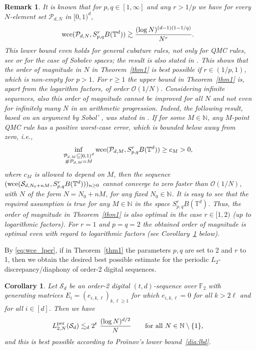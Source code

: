 \documentclass[12pt, a4paper]{article}
\newtheorem{cor}[thm]{Corollary}
\newtheorem{rem}[thm]{Remark}
\def\P{\mathcal{P}}
\def\S{\mathcal{S}}
\newcommand{\wce}{{\rm wce}}
\newcommand{\N}{{\mathbb{N}}} %
\newcommand{\calP}{{\mathcal{P}}}
\newcommand{\bbT}{{\mathbb{T}}}
\newcommand{\bbN}{{\mathbb{N}}}
\begin{document}
\begin{rem}\rm 
It is known that for $p,q \in [1,\infty]$ and any $r>1/p$ we have for every $N$-element set $\calP_{d,N}$ in $[0,1)^d$, 
$$
\wce(\P_{d,N}, S^r_{p, q}B(\bbT^d)) \gtrsim \frac{(\log N)^{(d-1)(1-1/q)}}{N^r}.
$$ This lower bound even holds for general cubature rules, not only for QMC rules, see \cite[Theorem~4.1]{DU15} or \cite{T90} for the case of Sobolev spaces; the result is also stated in \cite[Theorem~5.5]{HMOU}. This shows that the order of magnitude in $N$ in Theorem~\ref{thm1} is best possible if $r \in (1/p,1)$, which is non-empty for $p>1$. For $r\ge 1$ the upper bound in Theorem~\ref{thm1} is, apart from the logarithm factors, of order $\mathcal{O}(1/N)$. Considering infinite sequences, also this order of magnitude cannot be improved for all $N$ and not even for infinitely many $N$ in an arithmetic progression. Indeed, the following result, based on an argument by Sobol' \cite{S98}, was stated in \cite[Proposition~1]{HKKN12}. If for some $M \in \bbN$, any $M$-point QMC rule has a positive worst-case error, which is bounded below away from zero, i.e.,
\begin{equation*}%
\inf_{\substack{\P_{d,M} \subseteq [0,1)^d\\ \#\P_{d,M}=M}}  \wce(\P_{d,M}, S^r_{p, q}B(\bbT^d)) \ge c_M > 0,
\end{equation*}
where $c_M$ is allowed to depend on $M$, then the sequence 
$(\wce(\S_{d,N_0+n M}, S^r_{p, q}B(\bbT^d)))_{n\ge 0}$
cannot converge to zero faster than $\mathcal{O}(1/N)$, with $N$ of the form $N = N_0 + n M$, for any fixed $N_0 \in \bbN$. It is easy to see that the required assumption is true for any $M\in \bbN$ in the space $S^r_{p, q}B(\bbT^d)$. Thus, the order of magnitude in Theorem~\ref{thm1} is also optimal in the case $r \in [1,2)$ (up to logarithmic factors). For $r=1$ and $p=q=2$ the obtained order of magnitude is optimal even with regard to logarithmic factors (see Corollary~\ref{cor:perL2} below).
\end{rem}


By \eqref{eq:wce_lper}, if in Theorem~\ref{thm1} the parameters $p,q$ are set to 2 and $r$ to 1, then we obtain the desired best possible estimate for the periodic $L_2$-discrepancy/diaphony of order-2 digital sequences.

\begin{cor}\label{cor:perL2}
Let $\S_d$ be an order-2 digital $(t,d)$-sequence over $\mathbb{F}_2$ with generating matrices $E_i=(e_{i,k,\ell})_{k,\ell \ge 1}$ for which $e_{i,k,\ell}=0$ for all $k > 2 \ell$ and for all $i \in [d]$. Then we have
\begin{equation*}
L_{2,N}^{{\rm per}}(\S_d) \lesssim_d 2^t \ \frac{(\log N)^{d/2}}{N} \qquad \mbox{for all } N \in \N \setminus\{1\}, 
\end{equation*}
and this is best possible according to Pro{\u\i}nov's lower bound~\eqref{dia:lbd}.
\end{cor}
\end{document}
